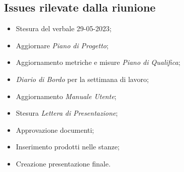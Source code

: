 \subsection{Issues rilevate dalla riunione}
\begin{itemize}
    \item Stesura del verbale 29-05-2023;
    \item Aggiornare \textit{Piano di Progetto};    
    \item Aggiornamento metriche e misure \textit{Piano di Qualifica};
    \item \textit{Diario di Bordo} per la settimana di lavoro;
    \item Aggiornamento \textit{Manuale Utente};
    \item Stesura \textit{Lettera di Presentazione};
    \item Approvazione documenti;
    \item Inserimento prodotti nelle stanze;
    \item Creazione presentazione finale.
\end{itemize}